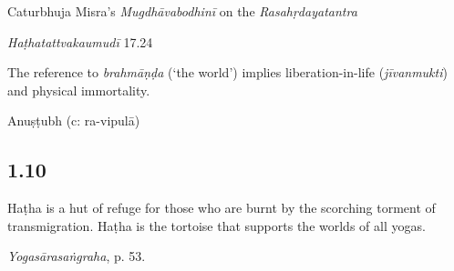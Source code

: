 \begin{ekdosis}
\begin{testimonia}[hp01_009]
Caturbhuja Misra's \emph{Mugdhāvabodhinī} on the \emph{Rasahṛdayatantra}

\begin{versinnote}
\end{versinnote}

\emph{Haṭhatattvakaumudī} 17.24

\begin{versinnote}
\end{versinnote}

\end{testimonia}

\begin{philcomm}[hp01_009]        
The reference to \emph{brahmāṇḍa} (‘the world’) implies liberation-in-life (\emph{jīvanmukti}) and physical immortality.  
\end{philcomm}

\begin{metre}[hp01_009]
Anuṣṭubh (c: ra-vipulā)
\end{metre}

\subsection*{1.10}
\begin{translation}[hp01_010]
Haṭha is a hut of refuge for those who are burnt by the scorching torment of transmigration. Haṭha is the tortoise that supports the worlds of all yogas.
\end{translation}

\begin{testimonia}[hp01_010]
\emph{Yogasārasaṅgraha}, p. 53.

\begin{versinnote}
\end{versinnote}

\end{testimonia}

\begin{philcomm}[hp01_010] 


\end{philcomm}
\end{ekdosis}
